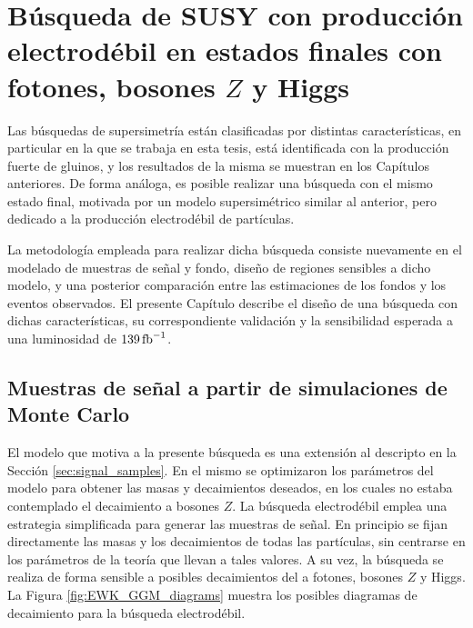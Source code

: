 \chapter{Búsqueda de SUSY con producción electrodébil en estados finales con fotones, bosones $Z$ y Higgs}\label{cap:analysis_EWK}

Las búsquedas de supersimetría están clasificadas por distintas características, en particular en la que se trabaja en esta tesis, está identificada con la producción fuerte de gluinos, y los resultados de la misma se muestran en los Capítulos anteriores. De forma análoga, es posible realizar una búsqueda con el mismo estado final, motivada por un modelo supersimétrico similar al anterior, pero dedicado a la producción electrodébil de partículas.

La metodología empleada para realizar dicha búsqueda consiste nuevamente en el modelado de muestras de señal y fondo, diseño de regiones sensibles a dicho modelo, y una posterior comparación entre las estimaciones de los fondos y los eventos observados. El presente Capítulo describe el diseño de una búsqueda con dichas características, su correspondiente validación y la sensibilidad esperada a una luminosidad de $139\,\text{fb}^{-1}$. 


\section{Muestras de señal a partir de simulaciones de Monte Carlo}

El modelo que motiva a la presente búsqueda es una extensión al descripto en la Sección \ref{sec:signal_samples}. En el mismo se optimizaron los parámetros del modelo para obtener las masas y decaimientos deseados, en los cuales no estaba contemplado el decaimiento a bosones $Z$. La búsqueda electrodébil emplea una estrategia simplificada para generar las muestras de señal. En principio se fijan directamente las masas y los decaimientos de todas las partículas, sin centrarse en los parámetros de la teoría que llevan a tales valores. A su vez, la búsqueda se realiza de forma sensible a posibles decaimientos del \ninoone a fotones, bosones $Z$ y Higgs. La Figura \ref{fig:EWK_GGM_diagrams} muestra los posibles diagramas de decaimiento para la búsqueda electrodébil.


